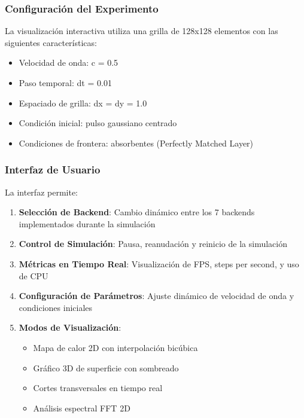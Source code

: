 \documentclass[a4paper]{article}
\begin{document}
\subsubsection{Configuración del Experimento}

La visualización interactiva utiliza una grilla de 128x128 elementos con las siguientes características:

\begin{itemize}
    \item Velocidad de onda: c = 0.5
    \item Paso temporal: dt = 0.01
    \item Espaciado de grilla: dx = dy = 1.0
    \item Condición inicial: pulso gaussiano centrado
    \item Condiciones de frontera: absorbentes (Perfectly Matched Layer)
\end{itemize}

\subsubsection{Interfaz de Usuario}

La interfaz permite:

\begin{enumerate}
    \item \textbf{Selección de Backend}: Cambio dinámico entre los 7 backends implementados durante la simulación
    \item \textbf{Control de Simulación}: Pausa, reanudación y reinicio de la simulación
    \item \textbf{Métricas en Tiempo Real}: Visualización de FPS, steps per second, y uso de CPU
    \item \textbf{Configuración de Parámetros}: Ajuste dinámico de velocidad de onda y condiciones iniciales
    \item \textbf{Modos de Visualización}:
          \begin{itemize}
              \item Mapa de calor 2D con interpolación bicúbica
              \item Gráfico 3D de superficie con sombreado
              \item Cortes transversales en tiempo real
              \item Análisis espectral FFT 2D
          \end{itemize}
\end{enumerate}
\end{document}
